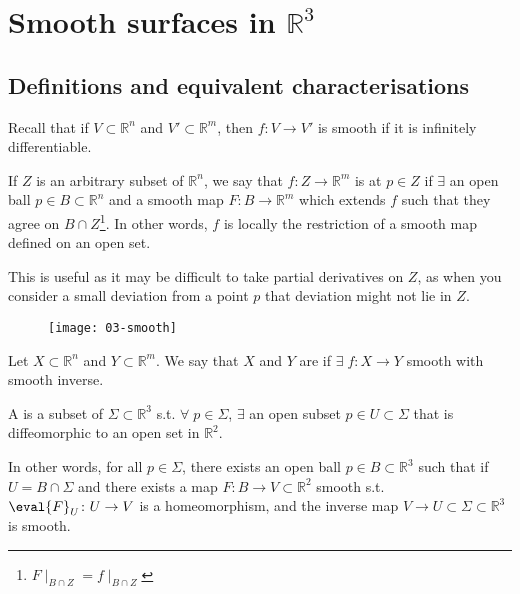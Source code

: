 \section{Smooth surfaces in $\mathbb R^3$}

\subsection{Definitions and equivalent characterisations}
Recall that if $V \subset \mathbb R^n$ and $V' \subset \mathbb R^m$, then $f \colon V \to V'$ is smooth if it is infinitely differentiable.

\begin{definition}
	If $Z$ is an arbitrary subset of $\mathbb R^n$, we say that $f \colon Z \to \mathbb R^m$ is  at $p \in Z$ if $\exists$ an open ball $p \in B \subset \mathbb R^n$ and a smooth map $F \colon B \to \mathbb R^m$ which extends $f$ such that they agree on $B \cap Z$\footnote{$F\mid_{B \cap Z} = f\mid_{B \cap Z}$}.
	In other words, $f$ is locally the restriction of a smooth map defined on an open set.
\end{definition}

\begin{remark}
	This is useful as it may be difficult to take partial derivatives on $Z$, as when you consider a small deviation from a point $p$ that deviation might not lie in $Z$.
\end{remark} 

\begin{figure}[h] 
    \centering 
    \texttt{[image: 03-smooth]} 
\end{figure}

\begin{definition}
	Let $X \subset \mathbb R^n$ and $Y \subset \mathbb R^m$.
	We say that $X$ and $Y$ are  if $\exists \; f \colon X \to Y$ smooth with smooth inverse.
\end{definition}

\begin{definition}
	A  is a subset of $\Sigma \subset \mathbb R^3$ s.t. $\forall \; p \in \Sigma$, $\exists$ an open subset $p \in U \subset \Sigma$ that is diffeomorphic to an open set in $\mathbb R^2$.
\end{definition}

In other words, for all $p \in \Sigma$, there exists an open ball $p \in B \subset \mathbb R^3$ such that if $U = B \cap \Sigma$ and there exists a map $F \colon B \to V \subset \mathbb R^2$ smooth s.t. $\eval{F}_U \colon U \to V$ is a homeomorphism, and the inverse map $V \to U \subset \Sigma \subset \mathbb R^3$ is smooth.

